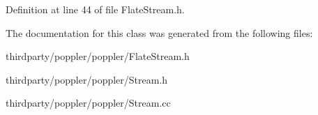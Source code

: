 Definition at line 44 of file Flate\+Stream.\+h.



The documentation for this class was generated from the following files\+:\begin{DoxyCompactItemize}
\item 
thirdparty/poppler/poppler/Flate\+Stream.\+h\item 
thirdparty/poppler/poppler/Stream.\+h\item 
thirdparty/poppler/poppler/Stream.\+cc\end{DoxyCompactItemize}
